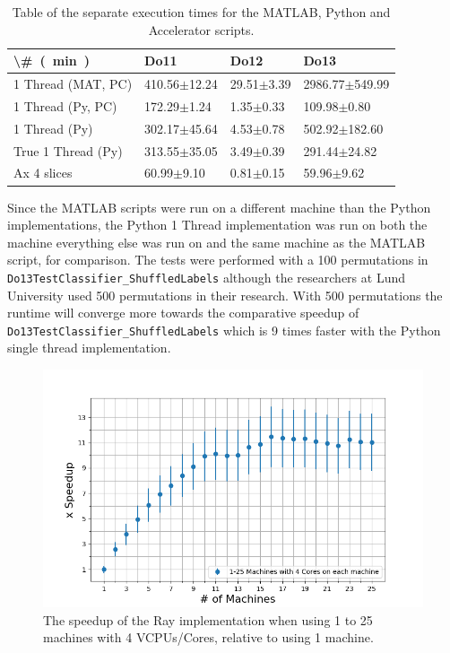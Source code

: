 \documentclass[12pt, a4paper]{article}
\begin{document}
\begin{table}[H]
\centering
    \begin{tabular}{|l|l|l|l|}
    \hline
    \SI[parse-numbers=false]{\#}{(\minute)}    & Do11             & Do12           & Do13               \\ \hline
    1 Thread (MAT, PC) & 410.56$\pm$12.24 & 29.51$\pm$3.39 & 2986.77$\pm$549.99 \\ \hline
    1 Thread (Py, PC)  & 172.29$\pm$1.24  & 1.35$\pm$0.33  & 109.98$\pm$0.80    \\ \hline
    1 Thread (Py)      & 302.17$\pm$45.64 & 4.53$\pm$0.78  & 502.92$\pm$182.60  \\ \hline
    True 1 Thread (Py) & 313.55$\pm$35.05 & 3.49$\pm$0.39  & 291.44$\pm$24.82   \\ \hline
    Ax 4 slices        & 60.99$\pm$9.10   & 0.81$\pm$0.15  & 59.96$\pm$9.62     \\ \hline
    \end{tabular}
    
    \caption{Table of the separate execution times for the MATLAB, Python and Accelerator scripts.}
    \label{AppendixSeperateTimes}
\end{table}


Since the MATLAB scripts were run on a different machine than the Python implementations, the Python 1 Thread implementation was run on both the machine everything else was run on and the same machine as the MATLAB script, for comparison.
The tests were performed with a 100 permutations in \texttt{Do13TestClassifier\_ShuffledLabels} although the researchers at Lund University used 500 permutations in their research.
With 500 permutations the runtime will converge more towards the comparative speedup of \texttt{Do13TestClassifier\_ShuffledLabels} which is 9 times faster with the Python single thread implementation.



\begin{figure}[H]
    \centering
    \includegraphics[width=1.0\textwidth, ]{pictures/MachinesXSpeedupWhite.png}
    \caption{The speedup of the Ray implementation when using 1 to 25 machines with 4 VCPUs/Cores, relative to using 1 machine.}
    \label{fig:MachineXSpeedup}
\end{figure}
\end{document}
